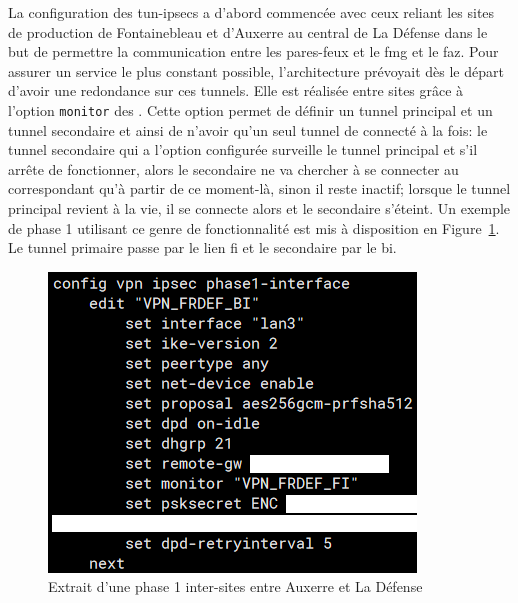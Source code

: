 \documentclass[12pt, oneside, a4paper, titlepage]{report}
\begin{document}
La configuration des \glspl{tun-ipsec} a d'abord commencée avec ceux reliant les
sites de production de Fontainebleau et d'Auxerre au central de La Défense dans
le but de permettre la communication entre les pares-feux et le \gls{fmg} et le
\gls{faz}. Pour assurer un service le plus constant possible, l'architecture
prévoyait dès le départ d'avoir une redondance sur ces tunnels. Elle est
réalisée entre sites grâce à l'option \texttt{monitor} des .
Cette option permet de définir un tunnel principal et un tunnel secondaire et
ainsi de n'avoir qu'un seul tunnel de connecté à la fois: le tunnel secondaire
qui a l'option configurée surveille le tunnel principal et s'il arrête de
fonctionner, alors le secondaire ne va chercher à se connecter au correspondant
qu'à partir de ce moment-là, sinon il reste inactif; lorsque le tunnel principal
revient à la vie, il se connecte alors et le secondaire s'éteint. Un exemple de
phase 1 utilisant ce genre de fonctionnalité est mis à disposition en
Figure~\ref{fig:fgt-auxr/ipsec-phase1}. Le tunnel primaire passe par le lien
\gls{fi} et le secondaire par le \gls{bi}.

\begin{figure}[h!]
    \centering
    \includegraphics[width = 0.6\linewidth]{img/fgt-auxr/ipsec-phase1.png}
    \caption{Extrait d'une phase 1 inter-sites entre Auxerre et La Défense}%
    \label{fig:fgt-auxr/ipsec-phase1}
\end{figure}
\end{document}
